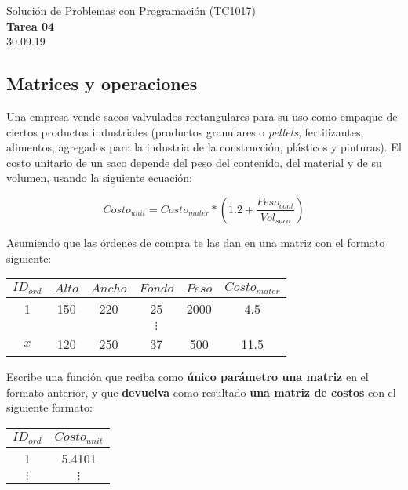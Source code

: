 \documentclass[]{book}
\theoremstyle{definition}
\begin{document}
\begin{center}
{\huge Solución de Problemas con Programación (TC1017)}\\[1.5ex]
{\large \textbf{Tarea 04}\\[1.5ex] %
30.09.19} %
\end{center}

\vspace{0.2 cm}

\subsection*{Matrices y operaciones}

Una empresa vende sacos valvulados rectangulares para su uso como empaque de ciertos productos industriales (productos granulares o \textit{pellets}, fertilizantes, alimentos, agregados para la industria de la construcción, plásticos y pinturas).
El costo unitario de un saco depende del peso del contenido, del material y de su volumen, usando la siguiente ecuación:

\bigskip

$$Costo_{unit} = Costo_{mater} * \left( 1.2 + \frac{Peso_{cont}}{Vol_{saco}} \right)$$

\bigskip

Asumiendo que las órdenes de compra te las dan en una matriz con el formato siguiente:

\begin{table}[htbp]
    \centering
    \begin{tabular}{@{}cccccc@{}}
    \toprule
    $ID_{ord}$ & $Alto$ & $Ancho$ & $Fondo$ & $Peso$ & $Costo_{mater}$ \\ \midrule
    1 & 150 & 220 & 25 & 2000 & 4.5 \\
     &  &  & $\vdots$ &  &  \\
    $x$ & 120 & 250 & 37 & 500 & 11.5 \\ \bottomrule
    \end{tabular}
\end{table}

Escribe una función que reciba como \textbf{único parámetro una matriz} en el formato anterior,
y que \textbf{devuelva} como resultado \textbf{una matriz de costos} con el siguiente formato:

\begin{table}[htbp]
    \centering
    \begin{tabular}{@{}cc@{}}
    \toprule
    $ID_{ord}$ & $Costo_{unit}$ \\ \midrule
    1 & 5.4101 \\
    $\vdots$ & $\vdots$ \\ \bottomrule
    \end{tabular}
\end{table}
\end{document}

